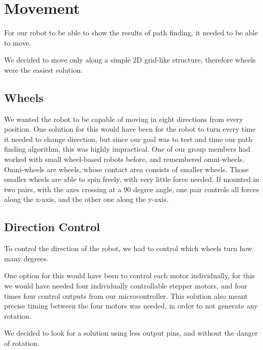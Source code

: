 \chapter{Movement}\label{ch:move}
For our robot to be able to show the results of path finding,
it needed to be able to move.

We decided to move only along a simple 2D grid-like structure,
therefore wheels were the easiest solution.

\section{Wheels}\label{sec:wheels}
We wanted the robot to be capable of moving in eight directions from every position.
One solution for this would have been for the robot to turn every time it needed to change direction,
but since our goal was to test and time our path finding algorithm,
this was highly impractical.
One of our group members had worked with small wheel-based robots before,
and remembered omni-wheels.
Omni-wheels are wheels,
whose contact area consists of smaller wheels.
Those smaller wheels are able to spin freely,
with very little force needed.
If mounted in two pairs,
with the axes crossing at a 90 degree angle, 
one pair controls all forces along the x-axis,
and the other one along the y-axis.

\section{Direction Control}\label{sec:direction}
To control the direction of the robot,
we had to control which wheels turn how many degrees.

One option for this would have been to control each motor individually,
for this we would have needed four individually controllable stepper motors,
and four times four control outputs from our microcontroller.
This solution also meant precise timing between the four motors was needed,
in order to not generate any rotation.

We decided to look for a solution using less output pins,
and without the danger of rotation.

